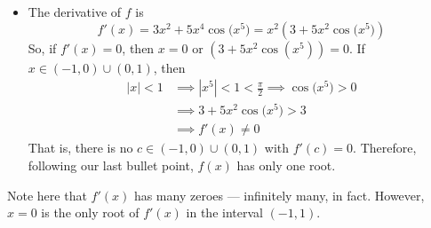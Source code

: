 \begin{solution}
\begin{itemize}
\item
The derivative of $f$ is
\begin{equation*}
f'(x)=3x^2+5x^4\cos\big(x^5\big)=x^2\left(3+5x^2\cos\big(x^5\big)\right)
\end{equation*}
So, if $f'(x)=0$, then $x=0$ or $\left(3+5x^2\cos\left(x^5\right)\right)=0$. 
If $x \in (-1,0) \cup (0,1)$, then 
\begin{align*}
|x|<1 &\implies |x^5|<1<\tfrac{\pi}{2}
      \implies \cos\big(x^5\big)>0 \\
      &\implies 3+5x^2\cos\big(x^5\big) > 3 \\
      &\implies f'(x) \neq 0
\end{align*}
That is, there is no $c \in (-1,0) \cup (0,1)$ with $f'(c)=0$. Therefore, following our last  bullet point, $f(x)$ has only one root.
\end{itemize}
Note here that $f'(x)$ has many zeroes --- infinitely many, in fact. However, $x=0$ is the only root of $f'(x)$ in the interval $(-1,1)$.
\end{solution}


